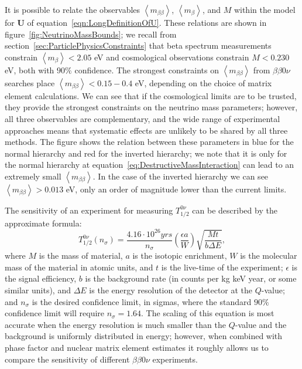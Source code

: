 It is possible to relate the observables $\left< m_{\beta\beta} \right>$, $\left< m_\beta \right>$, and $M$ within the model for $\mathbf{U}$ of equation~\ref{eqn:LongDefinitionOfU}.  These relations are shown in figure~\ref{fig:NeutrinoMassBounds}; we recall from section~\ref{sec:ParticlePhysicsConstraints} that beta spectrum measurements constrain $\left<m_\beta\right> < 2.05$ eV and cosmological observations constrain $M < 0.230$ eV, both with $90\%$ confidence.  The strongest constraints on $\left<m_{\beta\beta}\right>$ from $\beta\beta 0\nu$ searches place $\left<m_{\beta\beta}\right> < 0.15-0.4$ eV, depending on the choice of matrix element calculations.  We can see that if the cosmological limits are to be trusted, they provide the strongest constraints on the neutrino mass parameters; however, all three observables are complementary, and the wide range of experimental approaches means that systematic effects are unlikely to be shared by all three methods.  The figure shows the relation between these parameters in blue for the normal hierarchy and red for the inverted hierarchy; we note that it is only for the normal hierarchy at equation~\ref{eq:DestructiveMassInteraction} can lead to an extremely small $\left< m_{\beta\beta} \right>$.  In the case of the inverted hierarchy we can see $\left< m_{\beta\beta} \right> > 0.013$ eV, only an order of magnitude lower than the current limits.

The sensitivity of an experiment for measuring $T_{1/2}^{0\nu}$ can be described by the approximate formula:~\cite{RMPbb0n}
\begin{equation}\label{eqn:ApproxHalflifeSensitivity}
T_{1/2}^{0\nu}(n_\sigma) = \frac{4.16 \cdot 10^{26} yrs}{n_\sigma} \left( \frac{\epsilon a}{W}\right) \sqrt{\frac{Mt}{b \Delta E}},
\end{equation}
where $M$ is the mass of material, $a$ is the isotopic enrichment, $W$ is the molecular mass of the material in atomic units, and $t$ is the live-time of the experiment; $\epsilon$ is the signal efficiency, $b$ is the background rate (in counts per kg keV year, or some similar units), and $\Delta E$ is the energy resolution of the detector at the $Q$-value; and $n_\sigma$ is the desired confidence limit, in sigmas, where the standard $90\%$ confidence limit will require $n_\sigma = 1.64$.  The scaling of this equation is most accurate when the energy resolution is much smaller than the $Q$-value and the background is uniformly distributed in energy; however, when combined with phase factor and nuclear matrix element estimates it roughly allows us to compare the sensitivity of different $\beta\beta 0\nu$ experiments.

